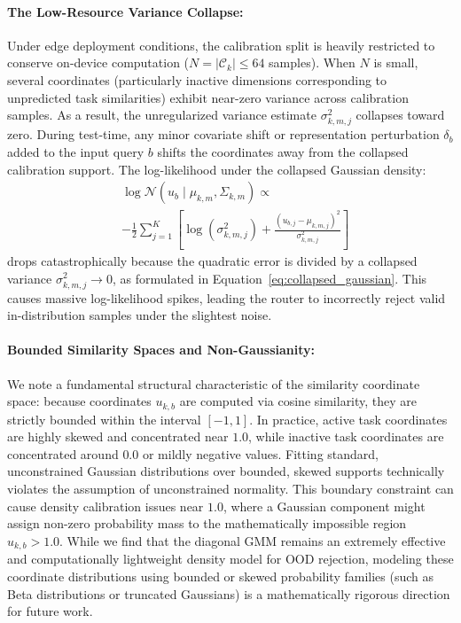 \paragraph{The Low-Resource Variance Collapse:} Under edge deployment conditions, the calibration split is heavily restricted to conserve on-device computation ($N = |\mathcal{C}_k| \le 64$ samples). When $N$ is small, several coordinates (particularly inactive dimensions corresponding to unpredicted task similarities) exhibit near-zero variance across calibration samples. As a result, the unregularized variance estimate $\sigma^2_{k, m, j}$ collapses toward zero. During test-time, any minor covariate shift or representation perturbation $\delta_b$ added to the input query $b$ shifts the coordinates away from the collapsed calibration support. The log-likelihood under the collapsed Gaussian density:
\begin{equation}
\label{eq:collapsed_gaussian}
\begin{split}
    &\log \mathcal{N}(u_b \mid \mu_{k,m}, \Sigma_{k,m}) \propto \\
    &-\frac{1}{2} \sum_{j=1}^K \left[ \log(\sigma^2_{k,m,j}) + \frac{(u_{b,j} - \mu_{k,m,j})^2}{\sigma^2_{k,m,j}} \right]
\end{split}
\end{equation}
drops catastrophically because the quadratic error is divided by a collapsed variance $\sigma^2_{k,m,j} \to 0$, as formulated in Equation~\ref{eq:collapsed_gaussian}. This causes massive log-likelihood spikes, leading the router to incorrectly reject valid in-distribution samples under the slightest noise.

\paragraph{Bounded Similarity Spaces and Non-Gaussianity:} We note a fundamental structural characteristic of the similarity coordinate space: because coordinates $u_{k, b}$ are computed via cosine similarity, they are strictly bounded within the interval $[-1, 1]$. In practice, active task coordinates are highly skewed and concentrated near $1.0$, while inactive task coordinates are concentrated around $0.0$ or mildly negative values. Fitting standard, unconstrained Gaussian distributions over bounded, skewed supports technically violates the assumption of unconstrained normality. This boundary constraint can cause density calibration issues near $1.0$, where a Gaussian component might assign non-zero probability mass to the mathematically impossible region $u_{k, b} > 1.0$. While we find that the diagonal GMM remains an extremely effective and computationally lightweight density model for OOD rejection, modeling these coordinate distributions using bounded or skewed probability families (such as Beta distributions or truncated Gaussians) is a mathematically rigorous direction for future work.

